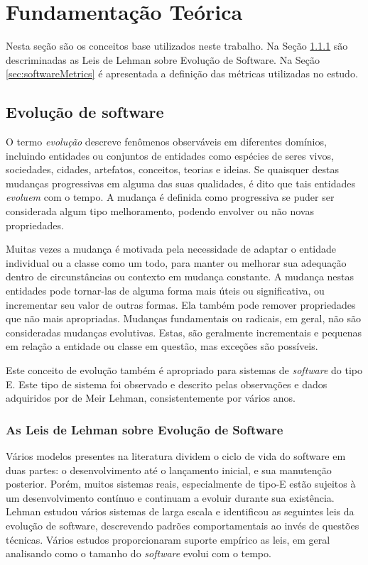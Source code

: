 \chapter{Fundamentação Teórica}
\label{chapter:fundamentos}

Nesta seção são os conceitos base utilizados neste trabalho. Na Seção \ref{sec:lehmalaws} são descriminadas as Leis de Lehman sobre Evolução de Software. Na Seção \ref{sec:softwareMetrics} é apresentada a definição das métricas utilizadas no estudo.
\section{Evolução de software}
O termo \textit{evolução} descreve fenômenos observáveis em diferentes domínios, incluindo entidades ou conjuntos de entidades como espécies de seres vivos, sociedades, cidades, artefatos, conceitos, teorias e ideias. Se quaisquer destas mudanças progressivas em alguma das suas qualidades, é dito que tais entidades \textit{evoluem} com o tempo. A mudança é definida como progressiva se puder ser considerada algum tipo melhoramento, podendo envolver ou não novas propriedades.

Muitas vezes a mudança é motivada pela necessidade de adaptar o entidade individual ou a classe como um todo, para manter ou melhorar sua adequação dentro de circunstâncias ou contexto em mudança constante. A mudança nestas entidades pode tornar-las de alguma forma mais úteis ou significativa, ou incrementar seu valor de outras formas. Ela também pode remover propriedades que não mais apropriadas. Mudanças fundamentais ou radicais, em geral, não são consideradas mudanças evolutivas. Estas, são geralmente incrementais e pequenas em relação a entidade ou classe em questão, mas exceções são possíveis.

Este conceito de evolução também é apropriado para sistemas de \textit{software} do tipo E. Este tipo de sistema foi observado e descrito pelas observações e dados adquiridos por de Meir Lehman, consistentemente por vários anos.
\subsection{As Leis de Lehman sobre Evolução de Software} \label{sec:lehmalaws}

Vários modelos presentes na literatura dividem o ciclo de vida do software em duas partes: o desenvolvimento até o lançamento inicial, e sua manutenção posterior. Porém, muitos sistemas reais, especialmente de tipo-E estão sujeitos à um desenvolvimento contínuo e continuam a evoluir durante sua existência. 
Lehman estudou vários sistemas de larga escala e identificou as seguintes leis da evolução de software, descrevendo padrões comportamentais ao invés de questões técnicas\cite{lehman1979understanding,lehman1996laws}. Vários estudos proporcionaram suporte empírico as leis, em geral analisando como o tamanho do \textit{software} evolui com o tempo.

